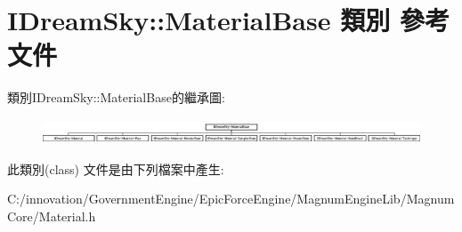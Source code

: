 \hypertarget{class_i_dream_sky_1_1_material_base}{}\section{I\+Dream\+Sky\+:\+:Material\+Base 類別 參考文件}
\label{class_i_dream_sky_1_1_material_base}
類別\+I\+Dream\+Sky\+:\+:Material\+Base的繼承圖\+:\begin{figure}[H]
\begin{center}
\leavevmode
\includegraphics[height=0.751174cm]{class_i_dream_sky_1_1_material_base}
\end{center}
\end{figure}


此類別(class) 文件是由下列檔案中產生\+:\begin{DoxyCompactItemize}
\item 
C\+:/innovation/\+Government\+Engine/\+Epic\+Force\+Engine/\+Magnum\+Engine\+Lib/\+Magnum\+Core/Material.\+h\end{DoxyCompactItemize}
